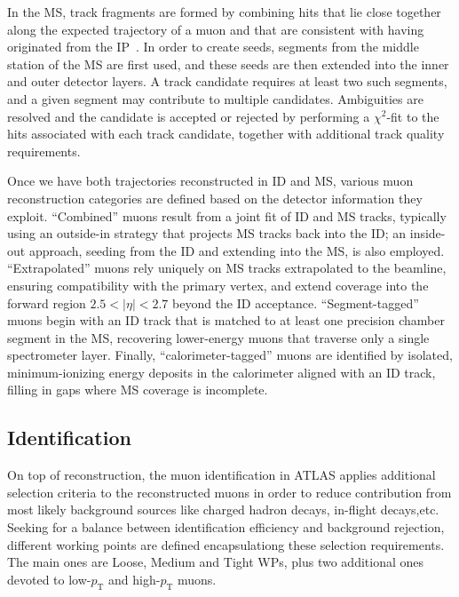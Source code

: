 In the MS, track fragments are formed by combining hits that lie close together along the expected trajectory of a muon and that are consistent with having originated from the IP~\cite{muon_reco_run2}. 
In order to create seeds, segments from the middle station of the MS are first used, and these seeds are then extended into the inner and outer detector layers. A track candidate requires at least two such segments, and a given segment may contribute to multiple candidates. Ambiguities are resolved and the candidate is accepted or rejected by performing a $\chi^2$-fit to the hits associated with each track candidate, together with additional track quality requirements.

Once we have both trajectories reconstructed in ID and MS, various muon reconstruction categories are defined based on the detector information they exploit. “Combined” muons result from a joint fit of ID and MS tracks, typically using an outside-in strategy that projects MS tracks back into the ID; an inside-out approach, seeding from the ID and extending into the MS, is also employed. “Extrapolated” muons rely uniquely on MS tracks extrapolated to the beamline, ensuring compatibility with the primary vertex, and extend coverage into the forward region $2.5 < |\eta| < 2.7$
beyond the ID acceptance. “Segment-tagged” muons begin with an ID track that is matched to at least one precision chamber segment in the MS, recovering lower-energy muons that traverse only a single spectrometer layer. Finally, “calorimeter-tagged” muons are identified by isolated, minimum-ionizing energy deposits in the calorimeter aligned with an ID track, filling in gaps where MS coverage is incomplete.

\subsection*{Identification} 

On top of reconstruction, the muon identification in ATLAS applies additional selection criteria to the reconstructed muons in order to reduce contribution from most likely background sources like charged hadron decays, in-flight decays,etc.
Seeking for a balance between identification efficiency and background rejection, different working points are defined encapsulationg these selection requirements. The main ones are Loose, Medium and Tight WPs, plus two additional ones devoted to low-$p_{\text{T}}$ and high-$p_{\text{T}}$ muons.

